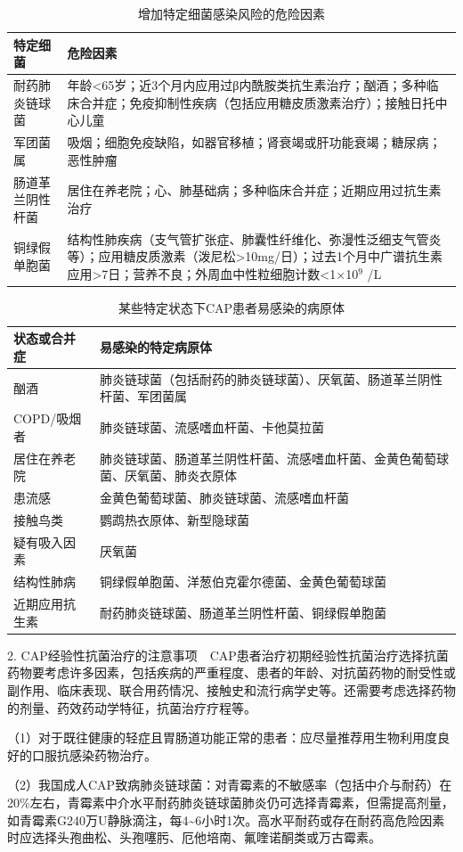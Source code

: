 \begin{longtable}[]{lp{7cm}}
  \caption{增加特定细菌感染风险的危险因素}
  \label{tab1-8-2}\\
\toprule
特定细菌 & 危险因素\tabularnewline
\midrule
\endhead
耐药肺炎链球菌 &
年龄\textless{}65岁；近3个月内应用过β内酰胺类抗生素治疗；酗酒；多种临床合并症；免疫抑制性疾病（包括应用糖皮质激素治疗）；接触日托中心儿童\tabularnewline
军团菌属 &
吸烟；细胞免疫缺陷，如器官移植；肾衰竭或肝功能衰竭；糖尿病；恶性肿瘤\tabularnewline
肠道革兰阴性杆菌 &
居住在养老院；心、肺基础病；多种临床合并症；近期应用过抗生素治疗\tabularnewline
铜绿假单胞菌 &
结构性肺疾病（支气管扩张症、肺囊性纤维化、弥漫性泛细支气管炎等）；应用糖皮质激素（泼尼松\textgreater{}10mg/日）；过去1个月中广谱抗生素应用\textgreater{}7日；营养不良；外周血中性粒细胞计数\textless{}1×10$^{9}$
/L\tabularnewline
\bottomrule
\end{longtable}

\begin{longtable}[]{lp{7cm}}
  \caption{某些特定状态下CAP患者易感染的病原体}
  \label{tab1-8-3}\\
\toprule
状态或合并症 & 易感染的特定病原体\tabularnewline
\midrule
\endhead
酗酒 &
肺炎链球菌（包括耐药的肺炎链球菌）、厌氧菌、肠道革兰阴性杆菌、军团菌属\tabularnewline
COPD/吸烟者 & 肺炎链球菌、流感嗜血杆菌、卡他莫拉菌\tabularnewline
居住在养老院 &
肺炎链球菌、肠道革兰阴性杆菌、流感嗜血杆菌、金黄色葡萄球菌、厌氧菌、肺炎衣原体\tabularnewline
患流感 & 金黄色葡萄球菌、肺炎链球菌、流感嗜血杆菌\tabularnewline
接触鸟类 & 鹦鹉热衣原体、新型隐球菌\tabularnewline
疑有吸入因素 & 厌氧菌\tabularnewline
结构性肺病 &
铜绿假单胞菌、洋葱伯克霍尔德菌、金黄色葡萄球菌\tabularnewline
近期应用抗生素 &
耐药肺炎链球菌、肠道革兰阴性杆菌、铜绿假单胞菌\tabularnewline
\bottomrule
\end{longtable}

2.
CAP经验性抗菌治疗的注意事项　CAP患者治疗初期经验性抗菌治疗选择抗菌药物要考虑许多因素，包括疾病的严重程度、患者的年龄、对抗菌药物的耐受性或副作用、临床表现、联合用药情况、接触史和流行病学史等。还需要考虑选择药物的剂量、药效药动学特征，抗菌治疗疗程等。

（1）对于既往健康的轻症且胃肠道功能正常的患者：应尽量推荐用生物利用度良好的口服抗感染药物治疗。

（2）我国成人CAP致病肺炎链球菌：对青霉素的不敏感率（包括中介与耐药）在20\%左右，青霉素中介水平耐药肺炎链球菌肺炎仍可选择青霉素，但需提高剂量，如青霉素G240万U静脉滴注，每4\textasciitilde{}6小时1次。高水平耐药或存在耐药高危险因素时应选择头孢曲松、头孢噻肟、厄他培南、氟喹诺酮类或万古霉素。

